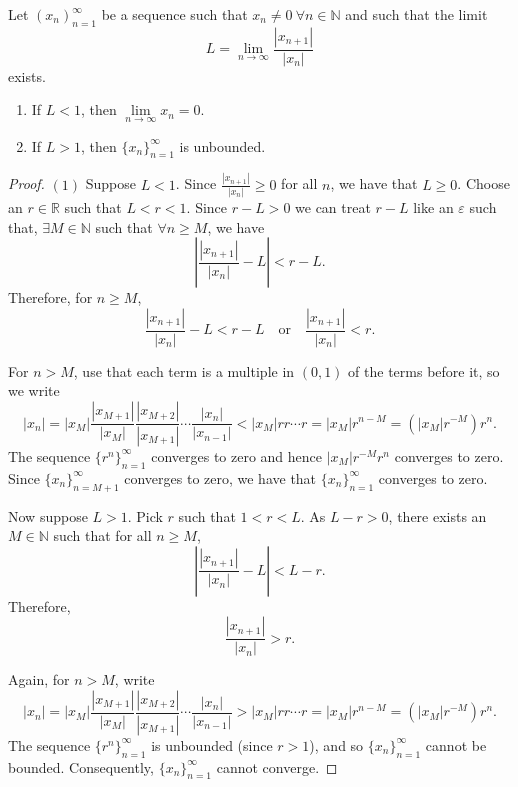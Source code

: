 \documentclass[../main.tex]{subfiles}
\begin{document}
    
    
    
    
    
    
    \begin{exercise} \label{ex:ratio_test}
    Let \( (x_n)_{n=1}^{\infty} \) be a sequence such that \( x_n \neq 0 \ \forall n \in \mathbb{N}\) and such that the limit
    \[
    L = \lim_{n \to \infty} \frac{|x_{n+1}|}{|x_n|}
    \]
    exists.
    \begin{enumerate}
        \item If \( L < 1 \), then \( \lim\limits_{n\to\infty} x_n = 0 \).
        \item If \( L > 1 \), then \( \{x_n\}_{n=1}^{\infty} \) is unbounded.
    \end{enumerate}
    \end{exercise}
    
    
    
    
    
    
    
    \begin{proof}
    \( (1) \) Suppose \( L < 1 \). Since \( \frac{|x_{n+1}|}{|x_n|} \geq 0 \) for all \( n \), we have that \( L \geq 0 \). Choose an \(r \in \mathbb{R}\) such that \( L < r < 1.\) Since \(r - L > 0\) we can treat \( r - L\) like an \( \varepsilon\) such that, \( \exists M \in \mathbb{N}\) such that \( \forall n \geq M\), we have
    \[
    \left| \frac{|x_{n+1}|}{|x_n|} - L \right| < r - L.
    \]
    Therefore, for \( n \geq M \),
    \[
    \frac{|x_{n+1}|}{|x_n|} - L < r - L \quad \text{or} \quad \frac{|x_{n+1}|}{|x_n|} < r.
    \]
    
    For \( n > M \), use that each term is a multiple in \((0,1)\) of the terms before it, so we write
    \[
    |x_n| = |x_M| \frac{|x_{M+1}|}{|x_M|} \frac{|x_{M+2}|}{|x_{M+1}|} \cdots \frac{|x_n|}{|x_{n-1}|} < |x_M| r r \cdots r = |x_M| r^{n-M} = (|x_M| r^{-M}) r^n.
    \]
    The sequence \( \{r^n\}_{n=1}^{\infty} \) converges to zero and hence \( |x_M| r^{-M} r^n \) converges to zero. Since \( \{x_n\}_{n=M+1}^{\infty} \) converges to zero, we have that \( \{x_n\}_{n=1}^{\infty} \) converges to zero.
    
    Now suppose \( L > 1 \). Pick \( r \) such that \( 1 < r < L \). As \( L - r > 0 \), there exists an \( M \in \mathbb{N} \) such that for all \( n \geq M \),
    \[
    \left| \frac{|x_{n+1}|}{|x_n|} - L \right| < L - r.
    \]
    Therefore,
    \[
    \frac{|x_{n+1}|}{|x_n|} > r.
    \]
    
    Again, for \( n > M \), write
    \[
    |x_n| = |x_M| \frac{|x_{M+1}|}{|x_M|} \frac{|x_{M+2}|}{|x_{M+1}|} \cdots \frac{|x_n|}{|x_{n-1}|} > |x_M| r r \cdots r = |x_M| r^{n-M} = (|x_M| r^{-M}) r^n.
    \]
    The sequence \( \{r^n\}_{n=1}^{\infty} \) is unbounded (since \( r > 1 \)), and so \( \{x_n\}_{n=1}^{\infty} \) cannot be bounded. Consequently, \( \{x_n\}_{n=1}^{\infty} \) cannot converge.   
    \end{proof}
    
\end{document}
